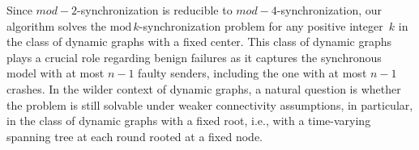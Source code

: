 \documentclass[11pt,letterpaper]{article}
\begin{document}
Since $mod-2$-synchronization is reducible to $mod-4$-synchronization,
	 our algorithm solves the $\mathrm{mod}\,k$-synchronization problem for any positive integer~$k$
	 in the class of  dynamic  graphs with a fixed center.
This class of dynamic graphs plays a crucial role regarding benign failures as it captures 
	the synchronous model with at most $n-1$ faulty senders, including the one with at most $n-1$ crashes.
In the wilder context of dynamic graphs, a natural question is whether the problem is still solvable 
	under weaker connectivity assumptions, in particular, in the class of dynamic graphs with a fixed root, 
	i.e., with a time-varying spanning tree at each round rooted at a fixed node.


\printbibliography
\end{document}
